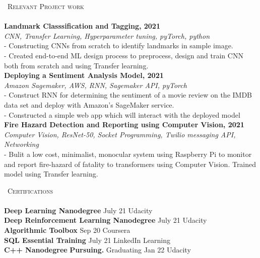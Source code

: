 \documentclass{article}
\newcommand{\lineunder} {
    \vspace*{-8pt} \\
    \hspace*{-18pt} \hrulefill \\
}
\newcommand{\header} [1] {
    {\hspace*{-18pt}\vspace*{6pt} \textsc{#1}}
    \vspace*{-6pt} \lineunder
}
\begin{document}
\header{\faMicrochip\ Relevant Project work}
{\textbf{Landmark Classsification and Tagging, 2021}} 
\\{\sl CNN, Transfer Learning, Hyperparameter tuning, pyTorch, python} \\
- Constructing CNNs from scratch to identify landmarks in sample image.\\- Created end-to-end ML design process to preprocess, design and train CNN both from scratch and using Transfer learning.\\
\vspace*{2mm}
{\textbf{Deploying a Sentiment Analysis Model, 2021}} 
\\{\sl Amazon Sagemaker, AWS, RNN, Sagemaker API, pyTorch} \\
- Construct RNN for determining the sentiment of a movie review on the IMDB data set and deploy with Amazon’s SageMaker service. \\- Constructed a simple web app which will interact with the deployed model\\
\vspace*{2mm}
{\textbf{Fire Hazard Detection and Reporting using Computer Vision, 2021}} 
\\{\sl Computer Vision, ResNet-50, Socket Programming, Twilio messaging API, Networking} \hfill \\
- Bulit a low cost, minimalist, monocular system using Raspberry Pi to monitor and report fire-hazard of fatality to transformers using Computer Vision. Trained model using Transfer learning.\\
\vspace*{3mm}


\header{\faBookmark\ Certifications}
\textbf{Deep Learning Nanodegree} \hfill July \textquotesingle{}21 \textbar{} Udacity\\

\vspace*{1mm}
\textbf{Deep Reinforcement Learning Nanodegree} \hfill July \textquotesingle{}21 \textbar{} Udacity\\

\vspace*{1mm}
\textbf{Algorithmic Toolbox} \hfill Sep \textquotesingle{}20 \textbar{} Coursera\\

\vspace*{1mm}
\textbf{SQL Essential Training} \hfill July \textquotesingle{}21 \textbar{} LinkedIn Learning\\

\vspace*{1mm}
\textbf{C++  Nanodegree} \hfill \textbf{Pursuing.} Graduating Jan \textquotesingle{}22 \textbar{} Udacity\\

\vspace*{9mm}

\end{document}
